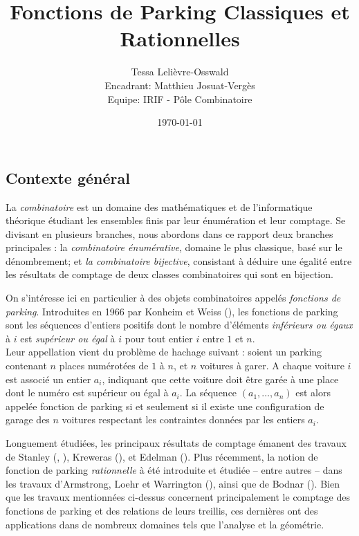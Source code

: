 \documentclass[11pt]{article}
\begin{document}
\title{Fonctions de Parking Classiques et Rationnelles}
\author{Tessa Lelièvre-Osswald\\
    {\small Encadrant: Matthieu Josuat-Vergès}\\
    {\small Equipe: IRIF - Pôle Combinatoire}}
\date{\today}

\maketitle

\subsection*{Contexte général}

La \emph{combinatoire} est un domaine des mathématiques et de 
l'informatique théorique étudiant les ensembles finis par leur énumération
et leur comptage.
Se divisant en plusieurs branches, nous abordons dans ce rapport deux
branches principales : la \emph{combinatoire énumérative}, domaine le plus
classique, basé sur le dénombrement; et \emph{la combinatoire bijective},
consistant à déduire une égalité entre les résultats de comptage de deux
classes combinatoires qui sont en bijection. 

On s'intéresse ici en particulier à des objets combinatoires appelés
\emph{fonctions de parking}. Introduites en 1966 par Konheim et Weiss
(\cite{ref1}), les fonctions de parking sont les séquences d'entiers
positifs dont le nombre d'éléments \emph{inférieurs ou égaux} à $i$ est
\emph{supérieur ou égal} à $i$ pour tout entier $i$ entre $1$ et $n$.\\
Leur appellation vient du problème de hachage suivant :
soient un parking contenant $n$ places numérotées de $1$ à $n$, et $n$
voitures à garer.
A chaque voiture $i$ est associé un entier $a_i$, indiquant que cette
voiture doit être garée à une place dont le numéro est supérieur ou égal
à $a_i$.
La séquence $(a_1, \ldots, a_n)$ est alors appelée fonction de parking si
et seulement si il existe une configuration de garage des $n$ voitures
respectant les contraintes données par les entiers $a_i$.

Longuement étudiées, les principaux résultats de comptage émanent des
travaux de Stanley (\cite{ref2}, \cite{ref3}), Kreweras (\cite{ref4}),
et Edelman (\cite{ref5}).
Plus récemment, la notion de fonction de parking \emph{rationnelle} à été
introduite et étudiée -- entre autres -- dans les travaux d'Armstrong, Loehr
et Warrington (\cite{ref7}), ainsi que de Bodnar (\cite{ref8}).
Bien que les travaux mentionnées ci-dessus concernent principalement le
comptage des fonctions de parking et des relations de leurs treillis, 
ces dernières ont des applications dans de nombreux domaines tels que
l'analyse et la géométrie.
\end{document}

